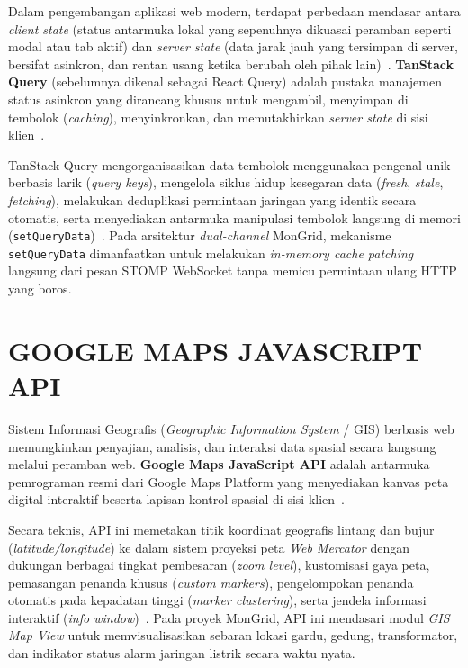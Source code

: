 Dalam pengembangan aplikasi web modern, terdapat perbedaan mendasar antara \textit{client state} (status antarmuka lokal yang sepenuhnya dikuasai peramban seperti modal atau tab aktif) dan \textit{server state} (data jarak jauh yang tersimpan di server, bersifat asinkron, dan rentan usang ketika berubah oleh pihak lain)~\cite{tanstack_query}. \textbf{TanStack Query} (sebelumnya dikenal sebagai React Query) adalah pustaka manajemen status asinkron yang dirancang khusus untuk mengambil, menyimpan di tembolok (\textit{caching}), menyinkronkan, dan memutakhirkan \textit{server state} di sisi klien~\cite{tanstack_query}.

TanStack Query mengorganisasikan data tembolok menggunakan pengenal unik berbasis larik (\textit{query keys}), mengelola siklus hidup kesegaran data (\textit{fresh}, \textit{stale}, \textit{fetching}), melakukan deduplikasi permintaan jaringan yang identik secara otomatis, serta menyediakan antarmuka manipulasi tembolok langsung di memori (\texttt{setQueryData})~\cite{tanstack_query}. Pada arsitektur \textit{dual-channel} MonGrid, mekanisme \texttt{setQueryData} dimanfaatkan untuk melakukan \textit{in-memory cache patching} langsung dari pesan STOMP WebSocket tanpa memicu permintaan ulang HTTP yang boros.

\section{GOOGLE MAPS JAVASCRIPT API}

Sistem Informasi Geografis (\textit{Geographic Information System} / GIS) berbasis web memungkinkan penyajian, analisis, dan interaksi data spasial secara langsung melalui peramban web. \textbf{Google Maps JavaScript API} adalah antarmuka pemrograman resmi dari Google Maps Platform yang menyediakan kanvas peta digital interaktif beserta lapisan kontrol spasial di sisi klien~\cite{google_maps_js}.

Secara teknis, API ini memetakan titik koordinat geografis lintang dan bujur (\textit{latitude/longitude}) ke dalam sistem proyeksi peta \textit{Web Mercator} dengan dukungan berbagai tingkat pembesaran (\textit{zoom level}), kustomisasi gaya peta, pemasangan penanda khusus (\textit{custom markers}), pengelompokan penanda otomatis pada kepadatan tinggi (\textit{marker clustering}), serta jendela informasi interaktif (\textit{info window})~\cite{google_maps_js}. Pada proyek MonGrid, API ini mendasari modul \textit{GIS Map View} untuk memvisualisasikan sebaran lokasi gardu, gedung, transformator, dan indikator status alarm jaringan listrik secara waktu nyata.


